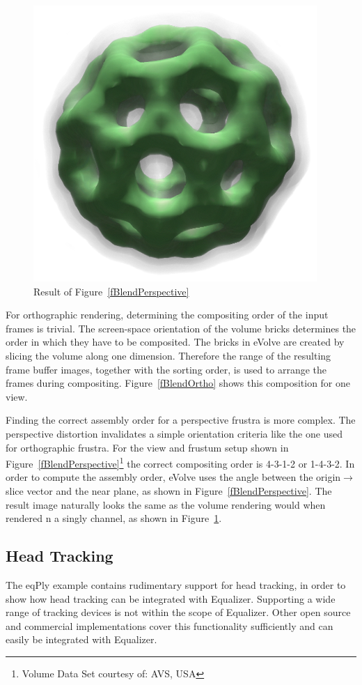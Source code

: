 \documentclass[10pt,a4]{scrartcl}
\newcommand{\fig}[1]{Figure~\ref{#1}}
\begin{document}
\begin{figure}
  \includegraphics[width=.4\textwidth]{images/volResult.png}
  {\caption{\small\label{fVolResult}Result of \fig{fBlendPerspective}}}
\end{figure}
For orthographic rendering, determining the compositing order of the
input frames is trivial. The screen-space orientation of the volume
bricks determines the order in which they have to be composited. The
bricks in \textsf{eVolve} are created by slicing the volume along one
dimension. Therefore the range of the resulting frame buffer images,
together with the sorting order, is used to arrange the frames during
compositing. \fig{fBlendOrtho} shows this composition for one view.

Finding the correct assembly order for a perspective frustra is more
complex. The perspective distortion invalidates a simple orientation
criteria like the one used for orthographic frustra. For the view and
frustum setup shown in \fig{fBlendPerspective}\footnote{Volume Data Set
  courtesy of: AVS, USA} the correct compositing order is 4-3-1-2 or
1-4-3-2. In order to compute the assembly order, \textsf{eVolve} uses
the angle between the origin$\rightarrow$slice vector and the near
plane, as shown in \fig{fBlendPerspective}. The result image naturally
looks the same as the volume rendering would when rendered n a singly
channel, as shown in \fig{fVolResult}.


\subsection{Head Tracking}

The \textsf{eqPly} example contains rudimentary support for head
tracking, in order to show how head tracking can be integrated with
Equalizer. Supporting a wide range of tracking devices is not within the
scope of Equalizer. Other open source and commercial implementations
cover this functionality sufficiently and can easily be integrated with
Equalizer.
\end{document}
